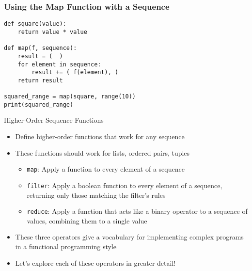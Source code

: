 \documentclass[14pt,aspectratio=169]{beamer}
\begin{document}
%
\begin{frame}[fragile]
  \frametitle{Using the Map Function with a Sequence}
  \begin{minipage}{6in}
    \vspace*{.15in}
    \begin{verbatim}
def square(value):
    return value * value

def map(f, sequence):
    result = (  )
    for element in sequence:
        result += ( f(element), )
    return result

squared_range = map(square, range(10))
print(squared_range)
    \end{verbatim}
  \end{minipage}
\end{frame}

%
\begin{frame}{Higher-Order Sequence Functions}
  \begin{itemize}
    \item Define higher-order functions that work for any sequence
      \vspace*{-.15in}
    \item These functions should work for lists, ordered pairs, tuples
      \begin{itemize}
        \item {\tt map}: Apply a function to every element of a sequence
        \item {\tt filter}: Apply a boolean function to every element of a
          sequence, returning only those matching the filter's rules
        \item {\tt reduce}: Apply a function that acts like a binary operator to
          a sequence of values, combining them to a single value
      \end{itemize}
      \vspace*{-.2in}
    \item These three operators give a vocabulary for implementing complex
      programs in a functional programming style
      \vspace*{-.2in}
    \item Let's explore each of these operators in greater detail!
  \end{itemize}
\end{frame}
\end{document}
